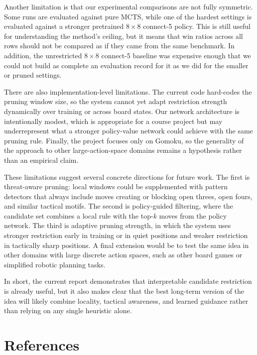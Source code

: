 \documentclass{article}
\begin{document}
Another limitation is that our experimental comparisons are not fully symmetric. Some runs are evaluated against pure MCTS, while one of the hardest settings is evaluated against a stronger pretrained \(8 \times 8\) connect-5 policy. This is still useful for understanding the method's ceiling, but it means that win ratios across all rows should not be compared as if they came from the same benchmark. In addition, the unrestricted \(8 \times 8\) connect-5 baseline was expensive enough that we could not build as complete an evaluation record for it as we did for the smaller or pruned settings.

There are also implementation-level limitations. The current code hard-codes the pruning window size, so the system cannot yet adapt restriction strength dynamically over training or across board states. Our network architecture is intentionally modest, which is appropriate for a course project but may underrepresent what a stronger policy-value network could achieve with the same pruning rule. Finally, the project focuses only on Gomoku, so the generality of the approach to other large-action-space domains remains a hypothesis rather than an empirical claim.

These limitations suggest several concrete directions for future work. The first is threat-aware pruning: local windows could be supplemented with pattern detectors that always include moves creating or blocking open threes, open fours, and similar tactical motifs. The second is policy-guided filtering, where the candidate set combines a local rule with the top-\(k\) moves from the policy network. The third is adaptive pruning strength, in which the system uses stronger restriction early in training or in quiet positions and weaker restriction in tactically sharp positions. A final extension would be to test the same idea in other domains with large discrete action spaces, such as other board games or simplified robotic planning tasks.

In short, the current report demonstrates that interpretable candidate restriction is already useful, but it also makes clear that the best long-term version of the idea will likely combine locality, tactical awareness, and learned guidance rather than relying on any single heuristic alone.

\section*{References}
\end{document}
